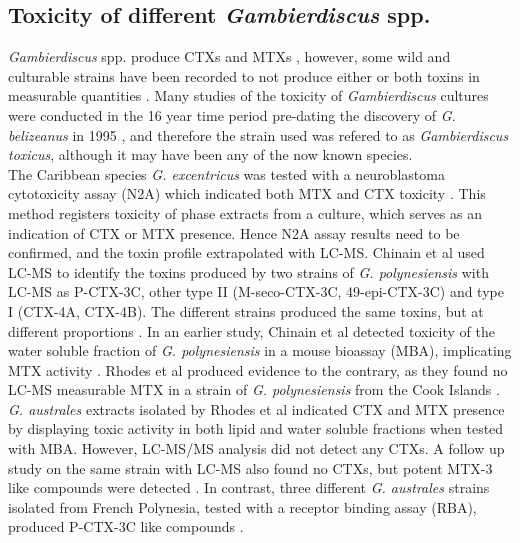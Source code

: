 \documentclass[12pt]{article}
\begin{document}
\subsection{Toxicity of different \emph{Gambierdiscus} spp.}
\emph{Gambierdiscus} spp. produce CTXs and MTXs \cite{murata1990structures,holmes1991strain,satake1993structure,holmes1994purification,satake1996isolation}, however, some wild and culturable strains have been recorded to not produce either or both toxins in measurable quantities \cite{gillespie1985significance,holmes1990toxicity}. Many studies of the toxicity of \emph{Gambierdiscus} cultures were conducted in the 16 year time period pre-dating the discovery of \emph{G. belizeanus} in 1995 \cite{faust1995observation}, and therefore the strain used was refered to as \emph{Gambierdiscus toxicus}, although it may have been any of the now known species. \\

The Caribbean species \emph{G. excentricus} was tested with a neuroblastoma cytotoxicity assay (N2A) which indicated both MTX and CTX toxicity \cite{fraga2011gambierdiscus}. This method registers toxicity of phase extracts from a culture, which serves as an indication of  CTX or MTX presence. 
Hence N2A assay results need to be confirmed, and the toxin profile extrapolated with LC-MS. 
Chinain et al used LC-MS to identify the toxins produced by two strains of \emph{G. polynesiensis} with LC-MS as P-CTX-3C, other type II (M-seco-CTX-3C, 49-epi-CTX-3C) and type I (CTX-4A, CTX-4B). The different strains produced the same toxins, but at different proportions \cite{chinain2010growth}. In an earlier study, Chinain et al detected toxicity of the water soluble fraction of \emph{G. polynesiensis} in a mouse bioassay (MBA), implicating MTX activity \cite{chinain1999morphology}. Rhodes et al produced evidence to the contrary, as they found no LC-MS measurable MTX in a strain of \emph{G. polynesiensis} from the Cook Islands \cite{rhodes2014production}.
\emph{G. australes} extracts isolated by Rhodes et al indicated CTX and MTX presence by displaying toxic activity in both lipid and water soluble fractions when tested with MBA. However, LC-MS/MS analysis did not detect any CTXs. A follow up study on the same strain with LC-MS also found no CTXs, but potent MTX-3 like compounds were detected \cite{rhodes2014production,rhodes2010toxic}. In contrast, three different \emph{G. australes} strains isolated from French Polynesia, tested with a receptor binding assay (RBA), produced P-CTX-3C like compounds \cite{chinain2010growth}.\\
\end{document}
